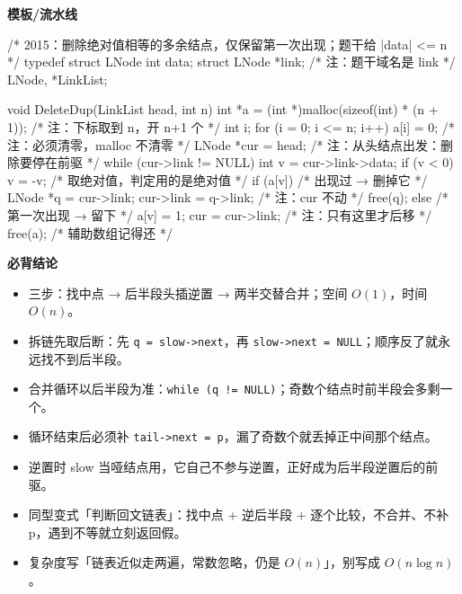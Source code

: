 \documentclass[10pt,a4paper]{ctexart}
\begin{document}
\textbf{模板/流水线}

\begin{codebox}
/* 2015：删除绝对值相等的多余结点，仅保留第一次出现；题干给 |data| <= n */
typedef struct LNode {
    int data;
    struct LNode *link;                    /* 注：题干域名是 link */
} LNode, *LinkList;

void DeleteDup(LinkList head, int n) {
    int *a = (int *)malloc(sizeof(int) * (n + 1));   /* 注：下标取到 n，开 n+1 个 */
    int i;
    for (i = 0; i <= n; i++) a[i] = 0;               /* 注：必须清零，malloc 不清零 */
    LNode *cur = head;                               /* 注：从头结点出发：删除要停在前驱 */
    while (cur->link != NULL) {
        int v = cur->link->data;
        if (v < 0) v = -v;                           /* 取绝对值，判定用的是绝对值 */
        if (a[v]) {                                  /* 出现过 → 删掉它 */
            LNode *q = cur->link;
            cur->link = q->link;                     /* 注：cur 不动 */
            free(q);
        } else {                                     /* 第一次出现 → 留下 */
            a[v] = 1;
            cur = cur->link;                         /* 注：只有这里才后移 */
        }
    }
    free(a);                                         /* 辅助数组记得还 */
}
\end{codebox}





\textbf{必背结论}

\begin{itemize}

\item 三步：找中点 → 后半段头插逆置 → 两半交替合并；空间 $O(1)$，时间 $O(n)$。

\item 拆链先取后断：先 \texttt{q = slow->next}，再 \texttt{slow->next = NULL}；顺序反了就永远找不到后半段。

\item 合并循环以后半段为准：\texttt{while (q != NULL)}；奇数个结点时前半段会多剩一个。

\item 循环结束后必须补 \texttt{tail->next = p}，漏了奇数个就丢掉正中间那个结点。

\item 逆置时 slow 当哑结点用，它自己不参与逆置，正好成为后半段逆置后的前驱。

\item 同型变式「判断回文链表」：找中点 + 逆后半段 + 逐个比较，不合并、不补 p，遇到不等就立刻返回假。

\item 复杂度写「链表近似走两遍，常数忽略，仍是 $O(n)$」，别写成 $O(n\log n)$。

\end{itemize}
\end{document}
